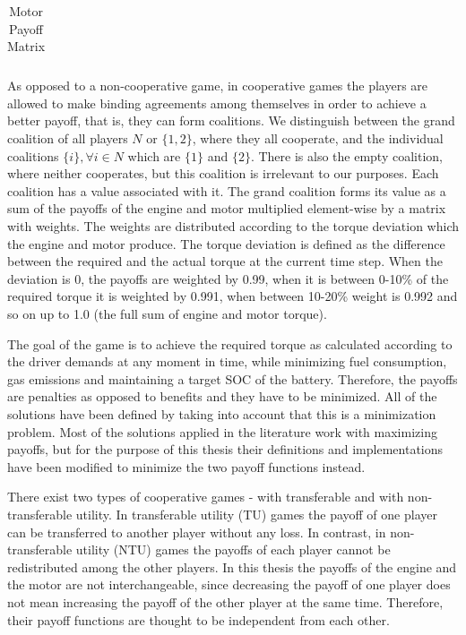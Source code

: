 {\begin{table}[h]
\begin{tabular}{ |c|c|c|c|c|c|c|c| }
\end{tabular}
\caption{Motor Payoff Matrix}
\label{tab:payoffMotor}
\end{table}

As opposed to a non-cooperative game, in cooperative games the players are allowed to make binding agreements among themselves in order to achieve a better payoff, that is, they can form coalitions. We distinguish between the grand coalition of all players $N$ or $\{1,2\}$, where they all cooperate, and the individual coalitions $\{i\}, \forall i \in N$ which are $\{1\}$ and $\{2\}$. There is also the empty coalition, where neither cooperates, but this coalition is irrelevant to our purposes. Each coalition has a value associated with it. The grand coalition forms its value as a sum of the payoffs of the engine and motor multiplied element-wise by a matrix with weights. The weights are distributed according to the torque deviation which the engine and motor produce. The torque deviation is defined as the difference between the required and the actual torque at the current time step. When the deviation is 0, the payoffs are weighted by 0.99, when it is between 0-10\% of the required torque it is weighted by 0.991, when between 10-20\% weight is 0.992 and so on up to 1.0 (the full sum of engine and motor torque).


The goal of the game is to achieve the required torque as calculated according to the driver demands at any moment in time, while minimizing fuel consumption, gas emissions and maintaining a target SOC of the battery. Therefore, the payoffs are penalties as opposed to benefits and they have to be minimized. All of the solutions have been defined by taking into account that this is a minimization problem. Most of the solutions applied in the literature work with maximizing payoffs, but for the purpose of this thesis their definitions and implementations have been modified to minimize the two payoff functions instead. 


There exist two types of cooperative games - with transferable and with non-transferable utility. In transferable utility (TU) games the payoff of one player can be transferred to another player without any loss. In contrast, in non-transferable utility (NTU) games the payoffs of each player cannot be redistributed among the other players. In this thesis the payoffs of the engine and the motor are not interchangeable, since decreasing the payoff of one player does not mean increasing the payoff of the other player at the same time. Therefore, their payoff functions are thought to be independent from each other.

}
